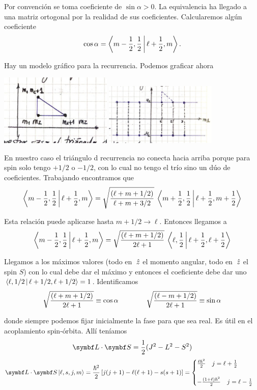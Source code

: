 \documentclass[10pt,oneside]{CBFT_book}
\begin{document}
Por convención se toma coeficiente de $\sin\alpha > 0$. La equivalencia ha llegado a una matriz
ortogonal por la realidad de sus coeficientes. Calcularemos algún coeficiente
\[
	\cos \alpha = \Braket{ m - \frac 1 2, \frac 1 2 | \ell + \frac 1 2, m }.
\]

Hay un modelo gráfico para la recurrencia. Podemos graficar ahora

\includegraphics[width=0.40\textwidth]{images/fig_ft2_recurrencia_1.jpg}
\includegraphics[width=0.40\textwidth]{images/fig_ft2_recurrencia_2.jpg}

En nuestro caso el triángulo d recurrencia no conecta hacia arriba porque para spin solo tengo
$+ 1/2$ o $-1/2$, con lo cual no tengo el trío sino un dúo de coeficientes.
Trabajando encontramos que
\[
	\Braket{ m - \frac 1 2, \frac 1 2 | \ell + \frac 1 2, m } =
	\sqrt{\frac{ ( \ell + m + 1 / 2 ) }{ \ell + m + 3 / 2 }} \:
	\Braket{ m + \frac 1 2, \frac 1 2 | \ell + \frac 1 2, m + \frac 1 2 }
\]

Esta relación puede aplicarse hasta $m+1/2 \to \ell$. Entonces llegamos a
\[
	\Braket{ m - \frac 1 2, \frac 1 2 | \ell + \frac 1 2, m } =
	\sqrt{\frac{ ( \ell + m + 1 / 2 ) }{ 2 \ell + 1 }} \:
	\Braket{ \ell, \frac 1 2 | \ell + \frac 1 2, \ell + \frac 1 2 }
\]

Llegamos a los máximos valores (todo en $\:\hat{z}$ el momento angular, todo en $\:\hat{z}$ el spin $S$)
con lo cual debe dar el máximo y entonces el coeficiente debe dar uno $\Braket{\ell,1/2| \ell+1/2,\ell+1/2} = 1$.
Identificamos
\[
	\sqrt{\frac{ ( \ell + m + 1 / 2 ) }{ 2 \ell + 1 }} \equiv \cos\alpha
	\qquad \qquad 
	\sqrt{\frac{ ( \ell - m + 1 / 2 ) }{ 2 \ell + 1 }} \equiv \sin\alpha
\]

donde siempre podemos fijar inicialmente la fase para que sea real.
Es útil en el acoplamiento spin-órbita. Allí teníamos
\[
	\pe{L}{S} = \frac{1}{2} ( J^2 - L^2 - S^2 )
\]
\[
	\pe{L}{S} \Ket{\ell,s, j, m} = 
	\frac{\hbar^2}{2} \left[ 
	j(j+1) - \ell(\ell+1) - s(s+1)
	\right] =
	\begin{cases}
		\frac{\ell \hbar^2}{2} \quad j = \ell + \frac{1}{2} \\
		\\
		-\frac{ ( 1 + \ell ) \hbar^2}{2} \quad j = \ell - \frac{1}{2}
	\end{cases}
\]
\end{document}
